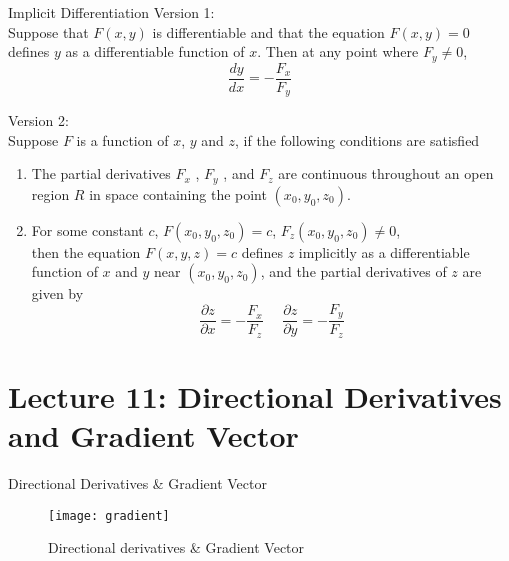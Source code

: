 \documentclass[10pt]{beamer}
\begin{document}
\begin{frame}[allowframebreaks]{Implicit Differentiation}
Version 1:\\
Suppose that $F(x, y)$ is differentiable and that the equation $F(x, y) = 0$ defines $y$
as a differentiable function of $x$. Then at any point where $F_y\neq 0$,
$$\dfrac{dy}{dx} = -\dfrac{F_x}{F_y}$$



Version 2:\\
Suppose $F$ is a function of $x$, $y$ and $z$, if the following conditions are satisfied
\begin{enumerate}
	\item The partial derivatives $F_x$ , $F_y$ , and $F_z$ are continuous throughout an open
	region $R$ in space containing the point $(x_0, y_0, z_0)$.
	\item For some constant $c$, $F(x_0,y_0,z_0) = c$, $F_z(x_0,y_0,z_0) \neq 0$,
	\\then the equation $F(x, y, z) = c$ defines $z$ implicitly as a differentiable function
	of $x$ and $y$ near $(x_0, y_0, z_0)$, and the partial derivatives of $z$ are given by
	$$\dfrac{\partial z}{\partial x} = -\dfrac{F_x}{F_z}~~~~~~\dfrac{\partial z}{\partial y} = - \dfrac{F_y}{F_z}$$
\end{enumerate}	
\end{frame}











\section{Lecture 11: Directional Derivatives and Gradient Vector} 



\begin{frame}[allowframebreaks]{Directional Derivatives \& Gradient Vector}
	
\begin{figure}[H]
	\centering
	\texttt{[image: gradient]}
	\caption{Directional derivatives \& Gradient Vector}
\end{figure}
	
	
\end{frame}
\end{document}
